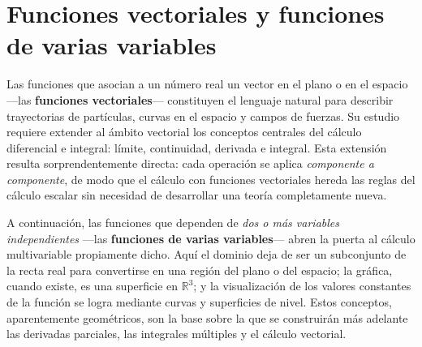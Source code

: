 \chapter{Funciones vectoriales y funciones de varias variables}
\label{ch:vector-multivariable}

Las funciones que asocian a un número real un vector en el plano o en el
espacio —las \textbf{funciones vectoriales}— constituyen el lenguaje
natural para describir trayectorias de partículas, curvas en el espacio
y campos de fuerzas. Su estudio requiere extender al ámbito vectorial
los conceptos centrales del cálculo diferencial e integral: límite,
continuidad, derivada e integral. Esta extensión resulta
sorprendentemente directa: cada operación se aplica \emph{componente a
componente}, de modo que el cálculo con funciones vectoriales hereda las
reglas del cálculo escalar sin necesidad de desarrollar una teoría
completamente nueva.

A continuación, las funciones que dependen de \emph{dos o más variables
independientes} —las \textbf{funciones de varias variables}— abren la
puerta al cálculo multivariable propiamente dicho. Aquí el dominio deja
de ser un subconjunto de la recta real para convertirse en una región
del plano o del espacio; la gráfica, cuando existe, es una superficie en
$\mathbb{R}^3$; y la visualización de los valores constantes de la
función se logra mediante curvas y superficies de nivel. Estos
conceptos, aparentemente geométricos, son la base sobre la que se
construirán más adelante las derivadas parciales, las integrales
múltiples y el cálculo vectorial.

